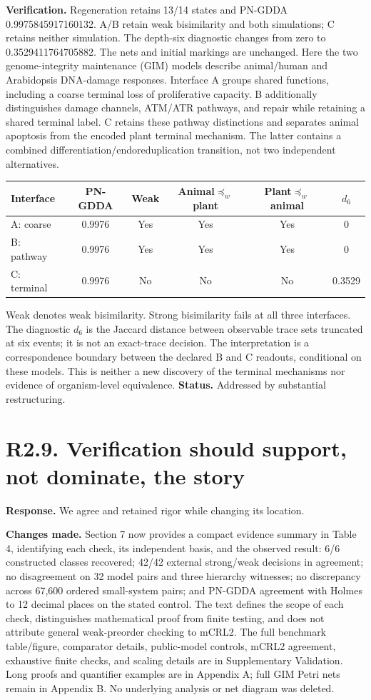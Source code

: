 \documentclass[11pt]{article}
\newcommand{\prew}{\mathrel{\preceq_w}}
\begin{document}
\textbf{Verification.} Regeneration retains 13/14 states and PN-GDDA
0.9975845917160132. A/B retain weak bisimilarity and both simulations; C
retains neither simulation. The depth-six diagnostic changes from zero to
0.3529411764705882. The nets and initial markings are unchanged.
Here the two genome-integrity maintenance (GIM) models describe animal/human
and Arabidopsis DNA-damage responses. Interface A groups shared functions,
including a coarse terminal loss of proliferative capacity. B additionally
distinguishes damage channels, ATM/ATR pathways, and repair while retaining
a shared terminal label. C retains these pathway distinctions and separates
animal apoptosis from the encoded plant terminal mechanism. The latter
contains a combined differentiation/endoreduplication transition, not two
independent alternatives.
\begin{center}
\small
\begin{tabular}{@{}lccccc@{}}
\toprule
Interface & PN-GDDA & Weak & Animal$\prew$plant & Plant$\prew$animal & $d_6$ \\
\midrule
A: coarse & 0.9976 & Yes & Yes & Yes & 0 \\
B: pathway & 0.9976 & Yes & Yes & Yes & 0 \\
C: terminal & 0.9976 & No & No & No & 0.3529 \\
\bottomrule
\end{tabular}
\end{center}
Weak denotes weak bisimilarity. Strong bisimilarity fails at all three
interfaces. The diagnostic $d_6$ is the Jaccard distance between observable
trace sets truncated at six events; it is not an exact-trace decision.
The interpretation is a correspondence boundary between the declared B and C
readouts, conditional on these models. This is neither a new discovery of the
terminal mechanisms nor evidence of organism-level equivalence.
\textbf{Status.} Addressed by substantial restructuring.

\section*{R2.9. Verification should support, not dominate, the story}
\textbf{Response.} We agree and retained rigor while changing its location.

\textbf{Changes made.} Section 7 now provides a compact evidence summary in
Table 4, identifying each check, its independent basis, and the observed result:
6/6 constructed classes recovered; 42/42 external strong/weak decisions in
agreement; no disagreement on 32 model pairs and three hierarchy witnesses;
no discrepancy across 67,600 ordered small-system pairs; and PN-GDDA agreement
with Holmes to 12 decimal places on the stated control. The text defines the
scope of each check, distinguishes mathematical proof from finite testing,
and does not attribute general weak-preorder checking to mCRL2.
The full benchmark table/figure, comparator details, public-model controls, mCRL2
agreement, exhaustive finite checks, and scaling details are in Supplementary
Validation. Long proofs and quantifier examples are in Appendix A; full GIM
Petri nets remain in Appendix B. No underlying analysis or net diagram was
deleted.
\end{document}
